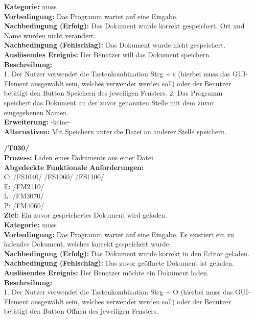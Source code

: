 \documentclass[a4paper]{scrreprt}
\begin{document}
\begin{addmargin}[15pt]{0pt}
\textbf{Kategorie:} muss\\
\textbf{Vorbedingung:} Das Programm wartet auf eine Eingabe.\\
\textbf{Nachbedingung (Erfolg):} Das Dokument wurde korrekt gespeichert. Ort und Name wurden nicht verändert.\\
\textbf{Nachbedingung (Fehlschlag):} Das Dokument wurde nicht gespeichert. \\
\textbf{Auslösendes Ereignis:} Der Benutzer will das Dokument speichern.\\
\textbf{Beschreibung:} \\
1. Der Nutzer verwendet die Tastenkombination Strg + s (hierbei muss das GUI-Element ausgewählt sein, welches verwendet werden soll) oder der Benutzer betätigt den Button Speichern des jeweiligen Fensters.
2. Das Programm speichert das Dokument an der zuvor genannten Stelle mit dem zuvor eingegebenen Namen. \\
\textbf {Erweiterung:} -keine- \\
\textbf {Alternativen:} Mit Speichern unter die Datei an anderer Stelle speichern. \\
\end{addmargin}
\textbf{/T030/} \\
\textbf{Prozess: }Laden eines Dokuments aus einer Datei \\
\textbf{Abgedeckte Funktionale Anforderungen:} \\
C: /FS1040/ /FS1060/ /FS1100/\\
E: /FM2110/	\\
L: /FM3070/ \\
P: /FM4060/\\
\textbf{Ziel:} Ein zuvor gespeichertes Dokument wird geladen.\\
\textbf{Kategorie:} muss\\
\textbf{Vorbedingung:} Das Programm wartet auf eine Eingabe. Es existiert ein zu ladendes Dokument, welches korrekt gespeichert wurde.\\
\textbf{Nachbedingung (Erfolg):} Das Dokument wurde korrekt in den Editor geladen. \\
\textbf{Nachbedingung (Fehlschlag):} Das zuvor geöffnete Dokument ist geladen. \\ 
\textbf{Auslösendes Ereignis:} Der Benutzer möchte ein Dokument laden. \\
\textbf{Beschreibung:} \\
1. Der Nutzer verwendet die Tastenkombination Strg + O (hierbei muss das GUI-Element ausgewählt sein, welches verwendet werden soll) oder der Benutzer betätigt den Button Öffnen des jeweiligen Fensters. \\
\end{document}
